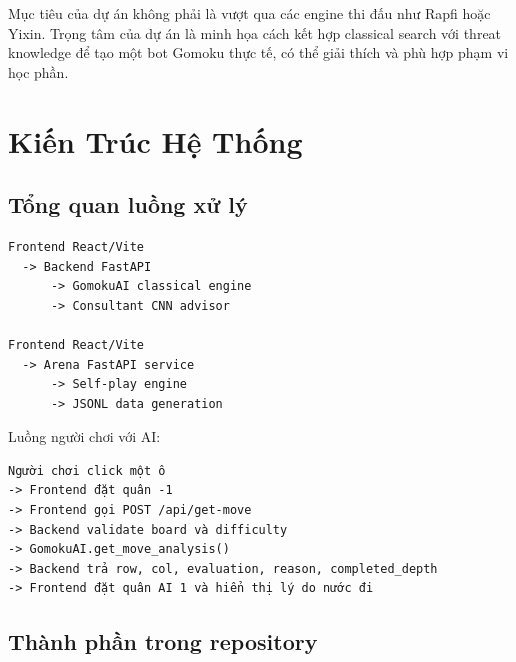 \documentclass[12pt,a4paper]{article}
\begin{document}
Mục tiêu của dự án không phải là vượt qua các engine thi đấu như Rapfi hoặc Yixin. Trọng tâm của dự án là minh họa cách kết hợp classical search với threat knowledge để tạo một bot Gomoku thực tế, có thể giải thích và phù hợp phạm vi học phần.

\section{Kiến Trúc Hệ Thống}
\label{sec:system}

\subsection{Tổng quan luồng xử lý}

\begin{lstlisting}[language={}]
Frontend React/Vite
  -> Backend FastAPI
      -> GomokuAI classical engine
      -> Consultant CNN advisor

Frontend React/Vite
  -> Arena FastAPI service
      -> Self-play engine
      -> JSONL data generation
\end{lstlisting}

Luồng người chơi với AI:

\begin{lstlisting}[language={}]
Người chơi click một ô
-> Frontend đặt quân -1
-> Frontend gọi POST /api/get-move
-> Backend validate board và difficulty
-> GomokuAI.get_move_analysis()
-> Backend trả row, col, evaluation, reason, completed_depth
-> Frontend đặt quân AI 1 và hiển thị lý do nước đi
\end{lstlisting}

\subsection{Thành phần trong repository}
\end{document}
